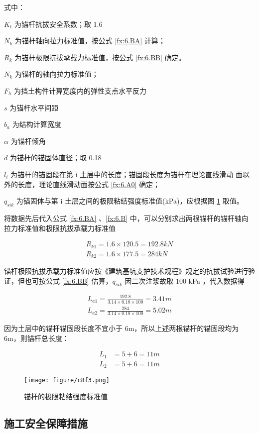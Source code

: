 式中： 

$K_t$ 为锚杆抗拔安全系数；取 1.6

$N_k$ 为锚杆轴向拉力标准值，按公式 \ref{fx:6.BA} 计算；

$R_k$ 为锚杆极限抗拔承载力标准值，按公式 \ref{fx:6.BB} 确定。

$N_k$ 为锚杆的轴向拉力标准值；

$F_h$ 为挡土构件计算宽度内的弹性支点水平反力

$s$ 为锚杆水平间距

$b_a$ 为结构计算宽度

$\alpha$ 为锚杆倾角

$d$ 为锚杆的锚固体直径；取 0.18

$l_i$ 为锚杆的锚固段在第 i 土层中的长度；锚固段长度为锚杆在理论直线滑动
面以外的长度，理论直线滑动面按公式 \ref{fx:6.A0} 确定；

$q_{sik}$ 为锚固体与第 i 土层之间的极限粘结强度标准值(kPa)，应根据图 \ref{fig:c8f3} 取值。

将数据先后代入公式 \ref{fx:6.BA} 、\ref{fx:6.B} 中，可以分别求出两根锚杆的锚杆轴向拉力标准值和极限抗拔承载力标准值

\begin{align*}
    R_{k1}=1.6×120.5=192.8kN\\
    R_{k2}=1.6×177.5=284kN
\end{align*}

锚杆极限抗拔承载力标准值应按《建筑基坑支护技术规程》规定的抗拔试验进行验证，但也可按公式 \ref{fx:6.BB} 估算，$q_{sik}$ 因二次注浆故取 100 kPa ，代入数据得

\begin{align*}
    L_{a1}=\frac{192.8}{3.14\times 0.18\times 100}=3.41 m\\
    L_{a2}=\frac{284}{3.14\times 0.18\times 100}=5.02 m
\end{align*}

因为土层中的锚杆锚固段长度不宜小于 6m，所以上述两根锚杆的锚固段均为 6m，则锚杆总长度：

\begin{align*}
L_1&=5+6=11m\\
L_2&=5+6=11m
\end{align*}

\begin{figure}[thbp!]
    \centering
    \texttt{[image: figure/c8f3.png]}
    \caption{锚杆的极限粘结强度标准值}
    \label{fig:c8f3}
\end{figure}

\subsection{施工安全保障措施}

